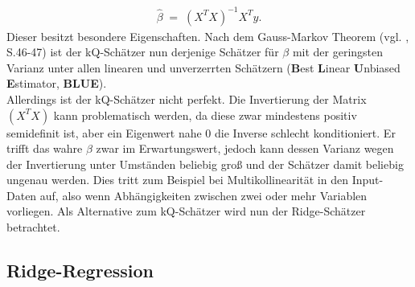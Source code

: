 \begin{align*}
	\hat{\beta}\;=\;\left(X^TX\right)^{-1}X^Ty.
\end{align*}
Dieser besitzt besondere Eigenschaften. Nach dem Gauss-Markov Theorem (vgl. \cite{Eco}, S.46-47) ist der kQ-Schätzer nun derjenige Schätzer für \(\beta\) mit der geringsten Varianz unter allen linearen und unverzerrten Schätzern (\textbf{B}est \textbf{L}inear \textbf{U}nbiased \textbf{E}stimator, \textbf{BLUE}).\\
Allerdings ist der kQ-Schätzer nicht perfekt. Die Invertierung der Matrix \(\left(X^TX\right)\) kann problematisch werden, da diese zwar mindestens positiv semidefinit ist, aber ein Eigenwert nahe 0 die Inverse schlecht konditioniert. Er trifft das wahre \(\beta\) zwar im Erwartungswert, jedoch kann dessen Varianz wegen der Invertierung unter Umständen beliebig groß und der Schätzer damit beliebig ungenau werden. Dies tritt zum Beispiel bei Multikollinearität in den Input-Daten auf, also wenn Abhängigkeiten zwischen zwei oder mehr Variablen vorliegen. Als Alternative zum kQ-Schätzer wird nun der Ridge-Schätzer betrachtet.

\subsection{Ridge-Regression}

